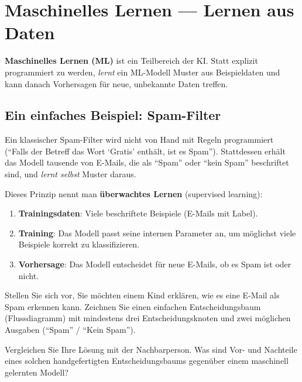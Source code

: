 \section{Maschinelles Lernen --- Lernen aus Daten}

\begin{mydefinition}
\textbf{Maschinelles Lernen (ML)} ist ein Teilbereich der KI. Statt explizit
programmiert zu werden, \emph{lernt} ein ML-Modell Muster aus Beispieldaten
und kann danach Vorhersagen für neue, unbekannte Daten treffen.
\end{mydefinition}

\subsection{Ein einfaches Beispiel: Spam-Filter}

\begin{myexample}
Ein klassischer Spam-Filter wird nicht von Hand mit Regeln programmiert
(\enquote{Falls der Betreff das Wort \enquote{Gratis} enthält, ist es Spam}).
Stattdessen erhält das Modell tausende von E-Mails, die als \enquote{Spam} oder
\enquote{kein Spam} beschriftet sind, und \emph{lernt selbst} Muster daraus.

Dieses Prinzip nennt man \textbf{überwachtes Lernen} (supervised learning):
\begin{enumerate}
    \item \textbf{Trainingsdaten}: Viele beschriftete Beispiele (E-Mails mit Label).
    \item \textbf{Training}: Das Modell passt seine internen Parameter an, um
          möglichst viele Beispiele korrekt zu klassifizieren.
    \item \textbf{Vorhersage}: Das Modell entscheidet für neue E-Mails,
          ob es Spam ist oder nicht.
\end{enumerate}
\end{myexample}

\begin{myexercise}
Stellen Sie sich vor, Sie möchten einem Kind erklären, wie es eine E-Mail als Spam
erkennen kann. Zeichnen Sie einen einfachen Entscheidungsbaum (Flussdiagramm) mit
mindestens drei Entscheidungsknoten und zwei möglichen Ausgaben (\enquote{Spam} /
\enquote{Kein Spam}).

Vergleichen Sie Ihre Lösung mit der Nachbarperson.
Was sind Vor- und Nachteile eines solchen handgefertigten Entscheidungsbaums gegenüber
einem maschinell gelernten Modell?
\end{myexercise}

